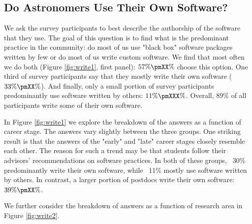 \subsection{Do Astronomers Use Their Own Software?}

We ask the survey participants to best describe the authorship of the software that they use. The goal of this question is to find what is the predominant practice in the community: do most of us use "black box" software packages written by few or do most of us write custom software. We find that most often we do both (Figure \ref{fig:write1}, first panel): $57\%\pmXX\%$ choose this option. One third of survey participants say that they mostly write their own software ($33\%\pmXX\%$). And finally, only a small portion of survey participants predominantly use software written by others: $11\%\pmXXX\%$. Overall, 89\% of all participants write some of their own software.

In Figure \ref{fig:write1} we explore the breakdown of the answers as a function of career stage. The answers vary slightly between the three groups. One striking result is that the answers of the "early" and "late" career stages closely resemble each other. The reason for such a trend may be that students follow their advisors' recommendations on software practices. In both of these groups, ~30\% predominantly write their own software, while ~11\% mostly use software written by others. In contrast, a larger portion of postdocs write their own software: $39\%\pmXX\%$. 

We further consider the breakdown of answers as a function of research area in Figure \ref{fig:write2}. 
